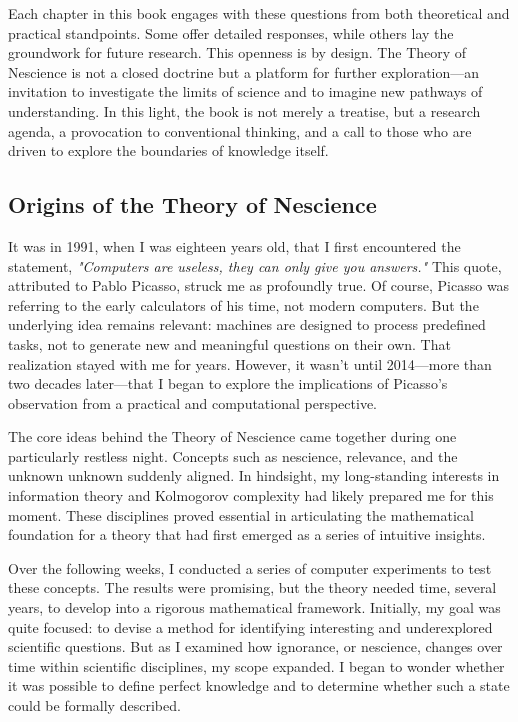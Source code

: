 Each chapter in this book engages with these questions from both theoretical and practical standpoints. Some offer detailed responses, while others lay the groundwork for future research. This openness is by design. The Theory of Nescience is not a closed doctrine but a platform for further exploration—an invitation to investigate the limits of science and to imagine new pathways of understanding. In this light, the book is not merely a treatise, but a research agenda, a provocation to conventional thinking, and a call to those who are driven to explore the boundaries of knowledge itself.

%
%

\subsection*{Origins of the Theory of Nescience}

It was in 1991, when I was eighteen years old, that I first encountered the statement, \emph{"Computers are useless, they can only give you answers."} This quote, attributed to Pablo Picasso, struck me as profoundly true. Of course, Picasso was referring to the early calculators of his time, not modern computers. But the underlying idea remains relevant: machines are designed to process predefined tasks, not to generate new and meaningful questions on their own. That realization stayed with me for years. However, it wasn't until 2014—more than two decades later—that I began to explore the implications of Picasso's observation from a practical and computational perspective.

The core ideas behind the Theory of Nescience came together during one particularly restless night. Concepts such as nescience, relevance, and the unknown unknown suddenly aligned. In hindsight, my long-standing interests in information theory and Kolmogorov complexity had likely prepared me for this moment. These disciplines proved essential in articulating the mathematical foundation for a theory that had first emerged as a series of intuitive insights.

Over the following weeks, I conducted a series of computer experiments to test these concepts. The results were promising, but the theory needed time, several years, to develop into a rigorous mathematical framework. Initially, my goal was quite focused: to devise a method for identifying interesting and underexplored scientific questions. But as I examined how ignorance, or nescience, changes over time within scientific disciplines, my scope expanded. I began to wonder whether it was possible to define perfect knowledge and to determine whether such a state could be formally described.

